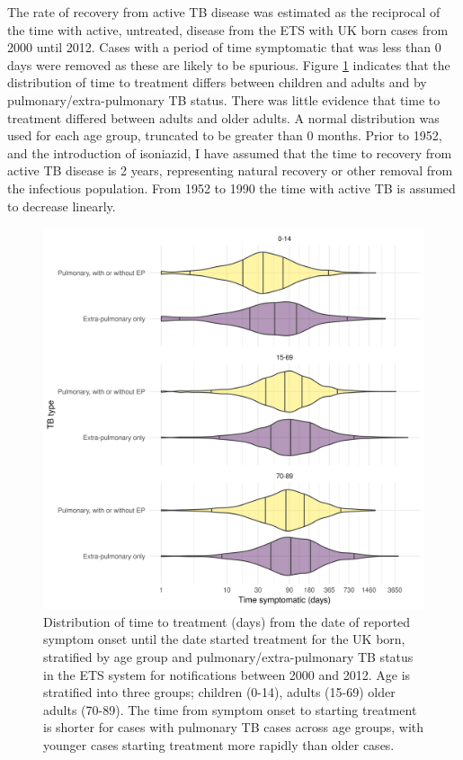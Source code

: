 \documentclass[11pt,twoside]{bristolthesis}
\begin{document}
  The rate of recovery from active TB disease was estimated as the reciprocal of the time with active, untreated, disease from the ETS with UK born cases from 2000 until 2012. Cases with a period of time symptomatic that was less than 0 days were removed as these are likely to be spurious. Figure \ref{fig:tb-time-treat} indicates that the distribution of time to treatment differs between children and adults and by pulmonary/extra-pulmonary TB status. There was little evidence that time to treatment differed between adults and older adults. A normal distribution was used for each age group, truncated to be greater than 0 months. Prior to 1952, and the introduction of isoniazid, I have assumed that the time to recovery from active TB disease is 2 years, representing natural recovery or other removal from the infectious population. From 1952 to 1990 the time with active TB is assumed to decrease linearly.
  \begin{figure}
  
  {\centering \includegraphics[width=0.8\linewidth,]{chapters/model-development/resources/figure/time_to_treatment} 
  
  }
  
  \caption[Distribution of time to treatment (days) from the date of reported symptom onset until the date started treatment for the UK born, stratified by age group and pulmonary/extra-pulmonary TB status in the ETS system for notifications between 2000 and 2012.]{Distribution of time to treatment (days) from the date of reported symptom onset until the date started treatment for the UK born, stratified by age group and pulmonary/extra-pulmonary TB status in the ETS system for notifications between 2000 and 2012. Age is stratified into three groups; children (0-14), adults (15-69) older adults (70-89). The time from symptom onset to starting treatment is shorter for cases with pulmonary TB cases across age groups, with younger cases starting treatment more rapidly than older cases.}\label{fig:tb-time-treat}
  \end{figure}
\end{document}
